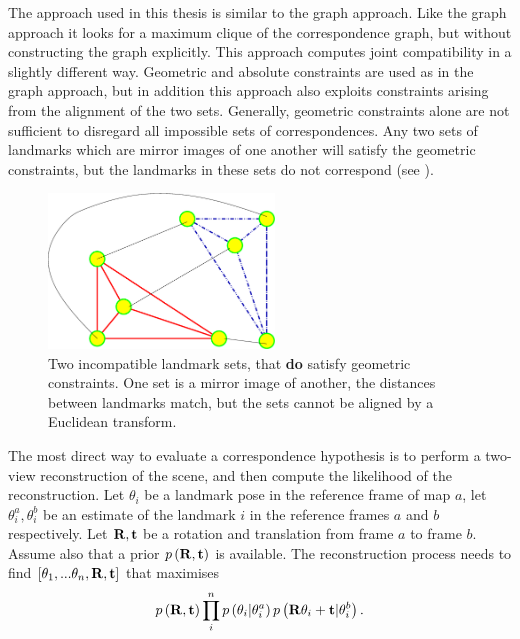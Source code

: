 The approach used in this thesis is similar to the graph approach.
Like the graph approach it looks for a maximum clique of the
correspondence graph, but without constructing the graph explicitly.
This approach computes joint compatibility in a slightly different
way. Geometric and absolute constraints are used as in the graph
approach, but in addition this approach also exploits constraints
arising from the alignment of the two sets. Generally, geometric
constraints alone are not sufficient to disregard all impossible sets
of correspondences. Any two sets of landmarks which are mirror images
of one another will satisfy the geometric constraints, but the
landmarks in these sets do not correspond (see
).

\begin{figure}[htbp]
  \centering
  \includegraphics[width=6cm]{Pics/fig_mirror_sets}
  \caption[Reflection and alignment]{Two incompatible landmark sets, that {\bf do} satisfy
    geometric constraints. One set is a mirror image of another, the
    distances between landmarks match, but the sets cannot be aligned
    by a Euclidean transform.
}
  \label{fig:mirror_sets}
\end{figure}

The most direct way to evaluate a correspondence hypothesis is to
perform a two-view reconstruction of the scene, and then compute the
likelihood of the reconstruction. Let $\theta_i$ be a landmark
pose in the reference frame of map $a$, let $\theta_i^a, \theta_i^b$
be an estimate of the landmark $i$ in the reference frames $a$ and
$b$ respectively. Let ${\bf R},{\bf t}$ be a rotation and translation
from frame $a$ to frame $b$. Assume also that a prior $p\left({\bf
R},{\bf t}\right)$ is available. The reconstruction process needs to
find $\left[\theta_1,...\theta_n, {\bf R},{\bf t}\right]$ that
maximises
\begin{equation}
p\left({\bf R},{\bf t}\right)
\prod_{i}^n p\left(\theta_i | \theta_i^a\right)
p\left({\bf R}\theta_i + {\bf t} | \theta_i^b\right).
\label{eqn:align}
\end{equation}

